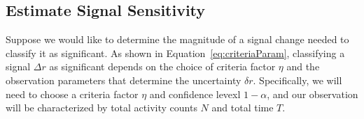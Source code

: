 \documentclass{article}
\begin{document}
%
%
%



\subsection{Estimate Signal Sensitivity}

Suppose we would like to determine the magnitude of a signal change needed to 
classify it as significant. As shown in Equation~\ref{eq:criteriaParam}, 
classifying a signal $\Delta r$ as significant depends on the choice of criteria factor 
$\eta$ and the observation parameters that determine the uncertainty $\delta r$. 
Specifically, we will need to choose a criteria factor $\eta$ and confidence levexl 
$1-\alpha$, and our observation will be characterized by total activity counts $N$ 
and total time $T$.
\end{document}
